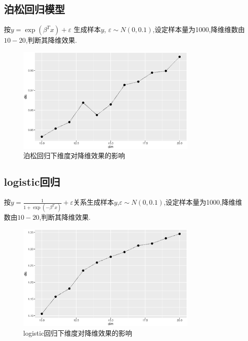 \subsection{泊松回归模型}
按$y = \exp{(\beta^Tx)}+\varepsilon$ 生成样本$y$, $\varepsilon \sim N(0,0.1)$,设定样本量为1000,降维维数由$10-20$,判断其降维效果.
\begin{figure}[H]
    \centering
    \includegraphics[width=0.8\textwidth]{image/pois_save.eps}
    \caption{泊松回归下维度对降维效果的影响}
\end{figure}


\subsection{logistic回归}

按$y = \frac{1}{1+\exp{(-\beta^Tx)}}+ \varepsilon$关系生成样本$y$,$\varepsilon \sim N(0,0.1)$,设定样本量为1000,降维维数由$10-20$,判断其降维效果.
\begin{figure}[H]
    \centering
    \includegraphics[width=0.8\textwidth]{image/logit_save.eps}
    \caption{logistic回归下维度对降维效果的影响}
\end{figure}



